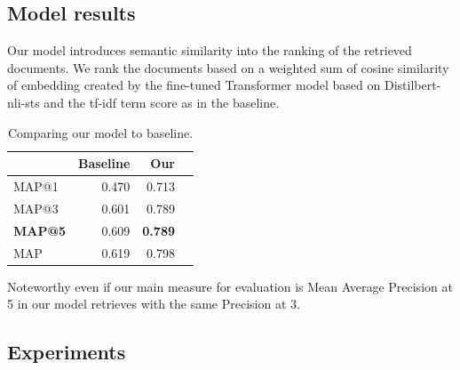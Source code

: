 \documentclass{article}
\begin{document}
\subsection{Model results}
Our model introduces semantic similarity into the ranking of the retrieved documents.
We rank the documents based on a weighted sum of cosine similarity of embedding created by the fine-tuned Transformer model based on Distilbert-nli-sts and the tf-idf term score as in the baseline.
\begin{table}[H]
\centering
\begin{threeparttable}
    \begin{tabular}{lrrr}
        \toprule
         & Baseline & Our  \\ \midrule
        MAP@1 		& 0.470 & 0.713  \\
	  MAP@3 		& 0.601 & 0.789 \\
        \textbf{MAP@5} & 0.609 & \textbf{0.789} \\
        MAP 			& 0.619 & 0.798 \\ \bottomrule
   \end{tabular}
\caption{Comparing our model to baseline.\\}
\end{threeparttable}
\end{table}
\noindent Noteworthy even if our main measure for evaluation is Mean Average Precision at 5 in our model retrieves with the same Precision at 3.
\subsection{Experiments}
\end{document}
